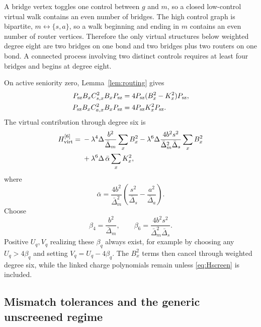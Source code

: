 \documentclass[11pt]{article}
\theoremstyle{definition}
\theoremstyle{remark}
\begin{document}
A bridge vertex toggles one control between $g$ and $m$, so a closed low-control virtual walk contains an even number of bridges.  The high control graph is bipartite, $m\leftrightarrow\{s,a\}$, so a walk beginning and ending in $m$ contains an even number of router vertices.  Therefore the only virtual structures below weighted degree eight are two bridges on one bond and two bridges plus two routers on one bond.  A connected process involving two distinct controls requires at least four bridges and begins at degree eight.

On active seniority zero, Lemma~\ref{lem:routing} gives
\begin{align}
 P_{\rm sz}B_xC_{s,x}^2B_xP_{\rm sz}&=4P_{\rm sz}(B_x^2-K_x^2)P_{\rm sz},\\
 P_{\rm sz}B_xC_{a,x}^2B_xP_{\rm sz}&=4P_{\rm sz}K_x^2P_{\rm sz}.
\end{align}
The virtual contribution through degree six is
\begin{equation}
\begin{aligned}
H_{\rm virt}^{[6]}={}&-\lambda^4\Delta\frac{b^2}{\bar\Delta_m}\sum_xB_x^2
-\lambda^6\Delta\frac{4b^2s^2}{\bar\Delta_m^2\bar\Delta_s}\sum_xB_x^2\\
&+\lambda^6\Delta\,\bar\alpha\sum_xK_x^2,
\end{aligned}
\label{eq:virt-six}
\end{equation}
where
\begin{equation}
 \boxed{\bar\alpha=\frac{4b^2}{\bar\Delta_m^2}
 \left(\frac{s^2}{\bar\Delta_s}-\frac{a^2}{\bar\Delta_a}\right).}
 \label{eq:alpha-bar}
\end{equation}
Choose
\begin{equation}
 \boxed{\beta_4=\frac{b^2}{\bar\Delta_m},
 \qquad
 \beta_6=\frac{4b^2s^2}{\bar\Delta_m^2\bar\Delta_s}.}
 \label{eq:betas}
\end{equation}
Positive $U_q,V_q$ realizing these $\beta_q$ always exist, for example by choosing any $U_q>4\beta_q$ and setting $V_q=U_q-4\beta_q$.  The $B_x^2$ terms then cancel through weighted degree six, while the linked charge polynomials remain unless \eqref{eq:Hscreen} is included.

\subsection{Mismatch tolerances and the generic unscreened regime}
\label{sec:tuning}
\end{document}
